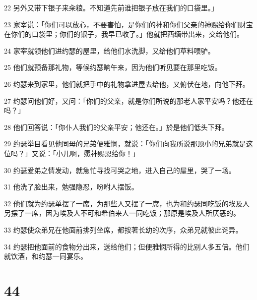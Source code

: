 \par 22 另外又带下银子来籴粮。不知道先前谁把银子放在我们的口袋里。」
\par 23 家宰说：「你们可以放心，不要害怕，是你们的神和你们父亲的神赐给你们财宝在你们的口袋里；你们的银子，我早已收了。」他就把西缅带出来，交给他们。
\par 24 家宰就领他们进约瑟的屋里，给他们水洗脚，又给他们草料喂驴。
\par 25 他们就预备那礼物，等候约瑟晌午来，因为他们听见要在那里吃饭。
\par 26 约瑟来到家里，他们就把手中的礼物拿进屋去给他，又俯伏在地，向他下拜。
\par 27 约瑟问他们好，又问：「你们的父亲，就是你们所说的那老人家平安吗？他还在吗？」
\par 28 他们回答说：「你仆人我们的父亲平安；他还在。」於是他们低头下拜。
\par 29 约瑟举目看见他同母的兄弟便雅悯，就说：「你们向我所说那顶小的兄弟就是这位吗？」又说：「小儿啊，愿神赐恩给你！」
\par 30 约瑟爱弟之情发动，就急忙寻找可哭之地，进入自己的屋里，哭了一场。
\par 31 他洗了脸出来，勉强隐忍，吩咐人摆饭。
\par 32 他们就为约瑟单摆了一席，为那些人又摆了一席，也为和约瑟同吃饭的埃及人另摆了一席，因为埃及人不可和希伯来人一同吃饭；那原是埃及人所厌恶的。
\par 33 约瑟使众弟兄在他面前排列坐席，都按著长幼的次序，众弟兄就彼此诧异。
\par 34 约瑟把他面前的食物分出来，送给他们；但便雅悯所得的比别人多五倍。他们就饮酒，和约瑟一同宴乐。

\chapter{44}

